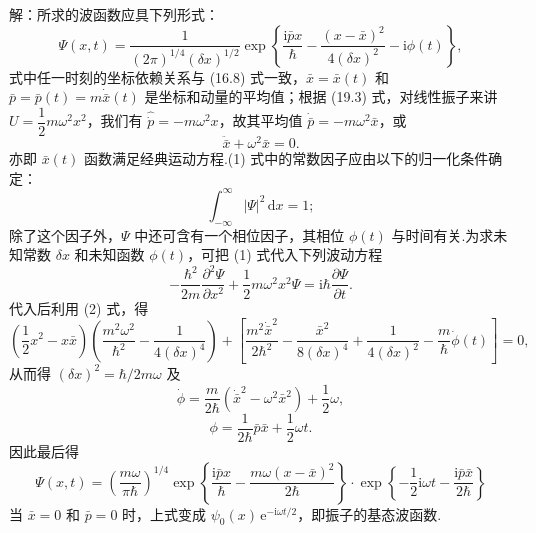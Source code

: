 \begin{xiti}
解：所求的波函数应具下列形式：
\begin{equation*}
  \varPsi(x,t)=\frac{1}{\left(2\pi\right)^{1/4}\left(\delta x\right)^{1/2}}
  \exp\left\{\frac{\mathrm{i}\bar{p}x}{\hbar}
  -\frac{\left(x-\bar{x}\right)^2}{4\left(\delta x\right)^2}
  -\mathrm{i}\phi(t)\right\},
\end{equation*}
式中任一时刻的坐标依赖关系与 (16.8) 式一致，$\bar{x}=\bar{x}(t)$ 和
$\bar{p}=\bar{p}(t)=m\dot{\bar{x}}(t)$ 是坐标和动量的平均值；根据 (19.3) 式，对线性振子来讲 $U=\dfrac{1}{2}m\omega^2x^2$，我们有 $\hat{\dot{p}}=-m\omega^2 x$，故其平均值 $\dot{\bar{p}}=-m\omega^2\bar{x}$，或
\begin{equation*}
  \ddot{\bar{x}}+\omega^2\bar{x}=0.
\end{equation*}
亦即 $\bar{x}(t)$ 函数满足经典运动方程.(1) 式中的常数因子应由以下的归一化条件确定：
\begin{equation*}
  \int_{-\infty}^{\infty}|\varPsi|^2\,\mathrm{d}x=1;
\end{equation*}
除了这个因子外，$\varPsi$ 中还可含有一个相位因子，其相位 $\phi(t)$ 与时间有关.为求未知常数 $\delta x$ 和未知函数 $\phi(t)$，可把 (1) 式代入下列波动方程
\begin{equation*}
  -\frac{\hbar^2}{2m}\frac{\partial^2\varPsi}{\partial x^2}
  +\frac{1}{2}m\omega^2 x^2\varPsi
  =\mathrm{i}\hbar\frac{\partial\varPsi}{\partial t}.
\end{equation*}
代入后利用 (2) 式，得
\begin{equation*}
  \left(\frac{1}{2}x^2-x\bar{x}\right)
  \left(\frac{m^2\omega^2}{\hbar^2}
  -\frac{1}{4\left(\delta x\right)^4}\right)
  +\left[\frac{m^2\dot{\bar{x}}^2}{2\hbar^2}
  -\frac{\bar{x}^2}{8\left(\delta x\right)^4}
  +\frac{1}{4\left(\delta x\right)^2}
  -\frac{m}{\hbar}\dot{\phi}(t)\right]=0,
\end{equation*}
从而得 $\left(\delta x\right)^2=\hbar/2m\omega$ 及
\begin{equation*}
  \dot{\phi}=\frac{m}{2\hbar}
  \left(\dot{\bar{x}}^2-\omega^2\bar{x}^2\right)+\frac{1}{2}\omega,
\end{equation*}
\begin{equation*}
  \phi=\frac{1}{2\hbar}\bar{p}\bar{x}+\frac{1}{2}\omega t.
\end{equation*}
因此最后得
\begin{equation*}
  \varPsi(x,t)=\left(\frac{m\omega}{\pi\hbar}\right)^{1/4}
  \exp\left\{\frac{\mathrm{i}\bar{p}x}{\hbar}
  -\frac{m\omega\left(x-\bar{x}\right)^2}{2\hbar}\right\}
  \cdot\exp\left\{-\frac{1}{2}\mathrm{i}\omega t
  -\frac{\mathrm{i}\bar{p}\bar{x}}{2\hbar}\right\}
\end{equation*}
当 $\bar{x}=0$ 和 $\bar{p}=0$ 时，上式变成 $\psi_0(x)\,\mathrm{e}^{-\mathrm{i}\omega t/2}$，即振子的基态波函数.


\end{xiti}

